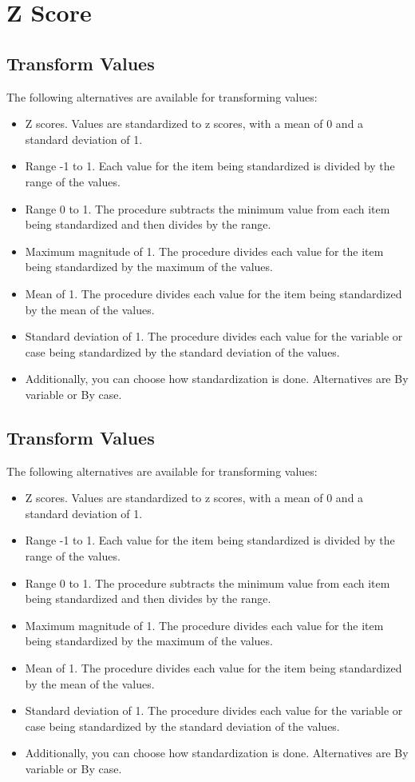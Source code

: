 \documentclass[]{report}
\begin{document}
\section{Z Score}

\subsection*{Transform Values}
The following alternatives are available for transforming values:
\begin{itemize}
	\item 	Z scores. Values are standardized to z scores, with a mean of 0 and a standard deviation of 1. 
	\item 	Range -1 to 1. Each value for the item being standardized is divided by the range of the values. 
	\item 	Range 0 to 1. The procedure subtracts the minimum value from each item being standardized and then divides by the range. 
	\item 	Maximum magnitude of 1. The procedure divides each value for the item being standardized by the maximum of the values. 
	\item 	Mean of 1. The procedure divides each value for the item being standardized by the mean of the values. 
	\item 	Standard deviation of 1. The procedure divides each value for the variable or case being standardized by the standard deviation of the values.
	\item Additionally, you can choose how standardization is done. Alternatives are By variable or By case.
\end{itemize}
\subsection*{Transform Values}
The following alternatives are available for transforming values:
\begin{itemize}
	\item 	Z scores. Values are standardized to z scores, with a mean of 0 and a standard deviation of 1. 
	\item 	Range -1 to 1. Each value for the item being standardized is divided by the range of the values. 
	\item 	Range 0 to 1. The procedure subtracts the minimum value from each item being standardized and then divides by the range. 
	\item 	Maximum magnitude of 1. The procedure divides each value for the item being standardized by the maximum of the values. 
	\item 	Mean of 1. The procedure divides each value for the item being standardized by the mean of the values. 
	\item 	Standard deviation of 1. The procedure divides each value for the variable or case being standardized by the standard deviation of the values.
	\item Additionally, you can choose how standardization is done. Alternatives are By variable or By case.
\end{itemize}
\end{document}
